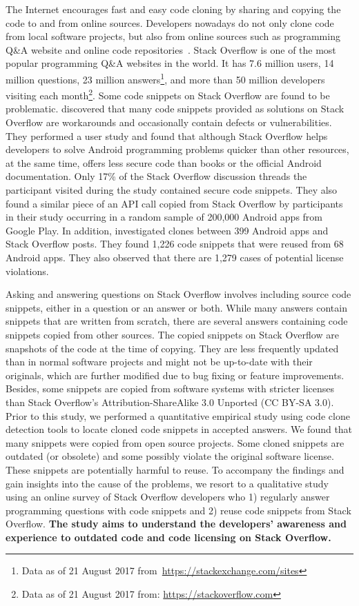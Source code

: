 \documentclass{svjour3}                     %
\begin{document}
The Internet encourages fast and easy code cloning by sharing and copying the
code to and from online sources. Developers nowadays do not only clone code from
local software projects, but also from online sources such as programming Q\&A
website and online code
repositories~\citep{Acar2016,Abdalkareem2017,An2017,Yang2017}. Stack Overflow is
one of the most popular programming Q\&A websites in the world. It has 7.6
million users, 14 million questions, 23 million answers\footnote{Data as of 21
	August 2017 from~\url{https://stackexchange.com/sites}}, and more than 50
million developers visiting each month\footnote{Data as of 21 August 2017 from:
	\url{https://stackoverflow.com}}. Some code snippets on Stack Overflow are found
to be problematic. \cite{Acar2016} discovered that many code snippets provided
as solutions on Stack Overflow are workarounds and occasionally contain defects
or vulnerabilities. They performed a user study and found that although Stack
Overflow helps developers to solve Android programming problems quicker than
other resources, at the same time, offers less secure code than books or the
official Android documentation. Only 17\% of the Stack Overflow discussion
threads the participant visited during the study contained secure code snippets.
They also found a similar piece of an API call copied from Stack Overflow by
participants in their study occurring in a random sample of 200,000 Android apps
from Google Play. In addition, \cite{An2017} investigated clones between 399
Android apps and Stack Overflow posts. They found 1,226 code snippets that were
reused from 68 Android apps. They also observed that there are 1,279 cases of
potential license violations.

Asking and answering questions on Stack Overflow involves including source code
snippets, either in a question or an answer or both. While many answers contain
snippets that are written from scratch, there are several answers containing
code snippets copied from other sources. The copied snippets on Stack Overflow
are snapshots of the code at the time of copying. They are less frequently
updated than in normal software projects and might not be up-to-date with their
originals, which are further modified due to bug fixing or feature improvements.
Besides, some snippets are copied from software systems with stricter licenses
than Stack Overflow's Attribution-ShareAlike 3.0 Unported (CC BY-SA 3.0). Prior
to this study, we performed a quantitative empirical study using code clone
detection tools to locate cloned code snippets in accepted answers. We found
that many snippets were copied from open source projects. Some cloned snippets
are outdated (or obsolete) and some possibly violate the original software
license. These snippets are potentially harmful to reuse. To accompany the
findings and gain insights into the cause of the problems, we resort to a
qualitative study using an online survey of Stack Overflow developers who 1)
regularly answer programming questions with code snippets and 2) reuse code
snippets from Stack Overflow. \textbf{The study aims to understand the
	developers' awareness and experience to outdated code and code licensing on
	Stack Overflow.}
\end{document}
